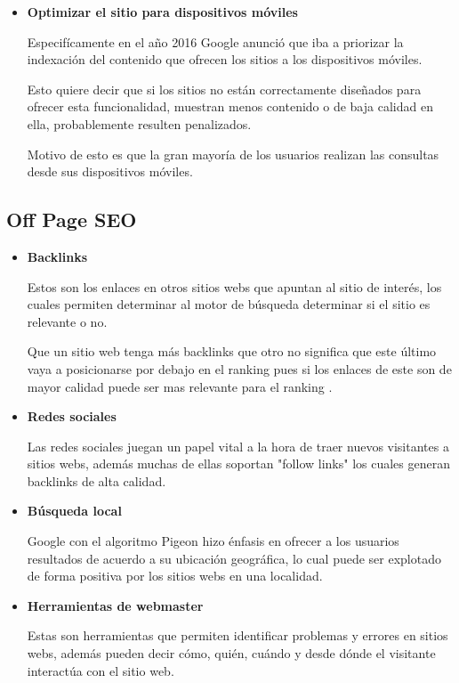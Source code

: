 \documentclass[12pt]{article}
\begin{document}
\begin{itemize}
\item \textbf{Optimizar el sitio para dispositivos móviles} \cite{mobile}

Especifícamente en el año 2016 Google anunció que iba a priorizar la indexación del contenido que ofrecen los sitios a los dispositivos móviles.

Esto quiere decir que si los sitios no están correctamente diseñados para ofrecer esta funcionalidad, muestran menos contenido o de baja calidad en ella, probablemente resulten penalizados.

Motivo de esto es que la gran mayoría de los usuarios realizan las consultas desde sus dispositivos móviles.


\end{itemize}

\subsection{Off Page SEO}
\begin{itemize}
\item \textbf{Backlinks}

Estos son los enlaces en otros sitios webs que apuntan al sitio de interés, los cuales permiten determinar al motor de búsqueda determinar si el sitio es relevante o no.

Que un sitio web tenga más backlinks que otro no significa que este último vaya a posicionarse por debajo en el ranking pues si los enlaces de este son de mayor calidad puede ser mas relevante para el ranking \cite{imp_seo}.

\item \textbf{Redes sociales}

Las redes sociales juegan un papel vital a la hora de traer nuevos visitantes a sitios webs, además muchas de ellas soportan "follow links" los cuales generan backlinks de alta calidad.

\item \textbf{Búsqueda local}

Google con el algoritmo Pigeon hizo énfasis en ofrecer a los usuarios resultados de acuerdo a su ubicación geográfica, lo cual puede ser explotado de forma positiva por los sitios webs en una localidad.

\item \textbf{Herramientas de webmaster}

Estas son herramientas que permiten identificar problemas y errores en sitios webs, además pueden decir cómo, quién, cuándo y desde dónde el visitante interactúa con el sitio web.

\end{itemize}
\end{document}
